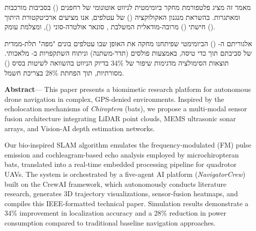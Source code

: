 
מאמר זה מציג פלטפורמת מחקר ביומימטית לניווט אוטונומי של רחפנים
() בסביבות מורכבות ומאתגרות.
בהשראת מנגנון האקולוקציה () של עטלפים,
אנו מציעים ארכיטקטורת היתוך חישתי () מרובה-מודאלית
המשלבת , סונאר אולטרה-סוני (),
ומצלמת עומק ().

אלגוריתם ה- () הביומימטי
שפיתחנו מחקה את האופן שבו עטלפים בונים "מפה" תלת-ממדית של סביבתם
תוך כדי טיסה, באמצעות פולסים  (תדר-משתנה) וניתוח השתקפויות
ב- מלאכותי.
תוצאות הסימולציה מדגימות שיפור של 34\% בדיוק הניווט
בהשוואה לשיטות בסיס () מסורתיות,
תוך הפחתת 28\% בצריכת חשמל.

\bigskip

\textbf{Abstract}—
This paper presents a biomimetic research platform for autonomous drone navigation
in complex, GPS-denied environments. Inspired by the echolocation mechanisms of
\textit{Chiroptera} (bats), we propose a multi-modal sensor fusion architecture
integrating LiDAR point clouds, MEMS ultrasonic sonar arrays, and Vision-AI
depth estimation networks.

Our bio-inspired SLAM algorithm emulates the frequency-modulated (FM) pulse
emission and cochleagram-based echo analysis employed by microchiropteran bats,
translated into a real-time embedded processing pipeline for quadrotor UAVs.
The system is orchestrated by a five-agent AI platform (\textit{NavigatorCrew})
built on the CrewAI framework, which autonomously conducts literature research,
generates 3D trajectory visualizations, sensor-fusion heatmaps, and compiles
this IEEE-formatted technical paper.
Simulation results demonstrate a 34\% improvement in localization accuracy
and a 28\% reduction in power consumption compared to traditional baseline
navigation approaches.


